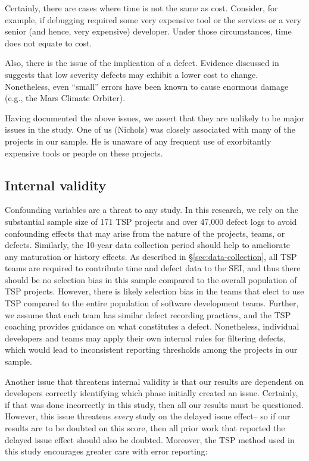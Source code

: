 \documentclass[smallcondesed]{svjour3}
\begin{document}
Certainly, there are cases where time is not the same as cost. Consider, for example,
if debugging required some very expensive tool or the services or a very senior (and hence, very expensive)
developer. Under those circumstances, time does not equate to cost.

Also, there is the issue of the implication of  a defect. Evidence discussed in \cite{Shull02} suggests that low severity defects may exhibit a lower cost to change. Nonetheless, even ``small'' errors have been known to cause enormous damage (e.g., the Mars Climate Orbiter). 

Having documented the above issues, we assert that they are unlikely to be major issues in the study.
One of us (Nichols)
was closely associated with many of the projects in our sample. He is unaware of any frequent
use of exorbitantly expensive tools or people on these projects. 


\subsection{Internal validity}
Confounding variables are a threat to any study. In this research, we rely on the substantial sample size of 171 TSP projects and over 47,000 defect logs to avoid confounding effects that may arise from the nature of the projects, teams, or defects. Similarly, the 10-year data collection period should help to ameliorate any maturation or history effects.  As described in \S\ref{sec:data-collection}, all TSP teams are required to contribute time and defect data to the SEI, and thus there should be no selection bias in this sample compared to the overall population of TSP projects. However, there is likely selection bias in the teams that elect to use TSP compared to the entire population of software development teams. Further, we assume that each team has similar defect recording practices, and the TSP coaching provides guidance on what constitutes a defect. Nonetheless, individual developers and teams may apply their own internal rules for filtering defects, which would lead to inconsistent reporting thresholds among the projects in our sample.

Another issue that threatens internal validity is that our
results are dependent on developers correctly identifying which
phase initially created an issue. Certainly, if that was done
incorrectly in this study, then all our results must be questioned.
However,  this issue threatens {\em every} study on the delayed
issue effect-- so if our results are to be doubted on this score,
then all prior work that reported the delayed issue effect should
also be doubted. Moreover, the TSP method used in this study
encourages greater care with error reporting:
\end{document}

